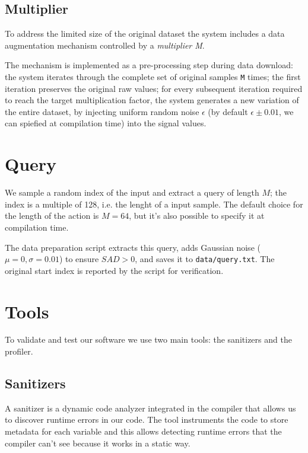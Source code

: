 \subsection{Multiplier}
\label{sec:multiplier}
To address the limited size of the original dataset the system includes a data augmentation mechanism controlled by a \textit{multiplier M}.

The mechanism is implemented as a pre-processing step during data download: the system iterates through the complete set of original samples \texttt{M} times; the first iteration preserves the original raw values; for every subsequent iteration required to reach the target multiplication factor, the system generates a new variation of the entire dataset, by injecting uniform random noise $\epsilon$ (by default $\epsilon\pm0.01$, we can spiefied at compilation time) into the signal values.

\section{Query}
\label{sec:input}
We sample a random index of the input and extract a query of length $M$; the index is a multiple of 128, i.e. the lenght of a input sample. The default choice for the length of the action is $M=64$, but it's also possible to specify it at compilation time.

The data preparation script extracts this query, adds Gaussian noise ($\mu=0, \sigma=0.01$) to ensure $SAD > 0$, and saves it to \texttt{data/query.txt}. The original start index is reported by the script for verification.

\section{Tools}
To validate and test our software we use two main tools: the sanitizers and the profiler.

\subsection{Sanitizers}
A sanitizer is a dynamic code analyzer integrated in the compiler that allows us to discover runtime errors in our code. The tool instruments the code to store metadata for each variable and this allows detecting runtime errors that the compiler can't see because it works in a static way.

